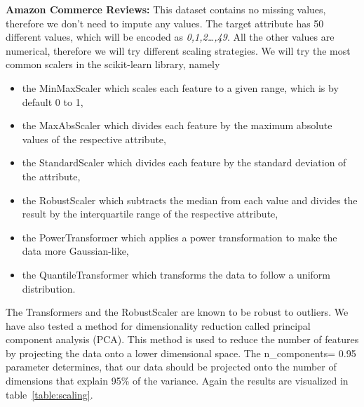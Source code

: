 \documentclass[a4paper,10pt]{article}
\begin{document}
\textbf{Amazon Commerce Reviews:} This dataset contains no missing values, therefore we don't need to impute any values.
The target attribute has 50 different values, which will be encoded as \textit{0,1,2\ldots,49}. 
All the other values are numerical, therefore we will try different scaling strategies.
We will try the most common scalers in the scikit-learn library, namely 
\begin{itemize}
    \item the MinMaxScaler which scales each feature to a given range, which is by default 0 to 1,
    \item the MaxAbsScaler which divides each feature by the maximum absolute values of the respective attribute,
    \item the StandardScaler which divides each feature by the standard deviation of the attribute,
    \item the RobustScaler which subtracts the median from each value and divides the result by the interquartile range of the respective attribute,
    \item the PowerTransformer which applies a power transformation to make the data more Gaussian-like,
    \item the QuantileTransformer which transforms the data to follow a uniform distribution.
\end{itemize}
The Transformers and the RobustScaler are known to be robust to outliers. We have also tested a method for dimensionality reduction called
principal component analysis (PCA). This method is used to reduce the number of features by projecting the data onto a lower dimensional space. 
The n\_components= 0.95 parameter determines, that our data should be projected onto the number of dimensions that explain 95\% of the variance.
Again the results are visualized in table~\ref{table:scaling}.
\end{document}
